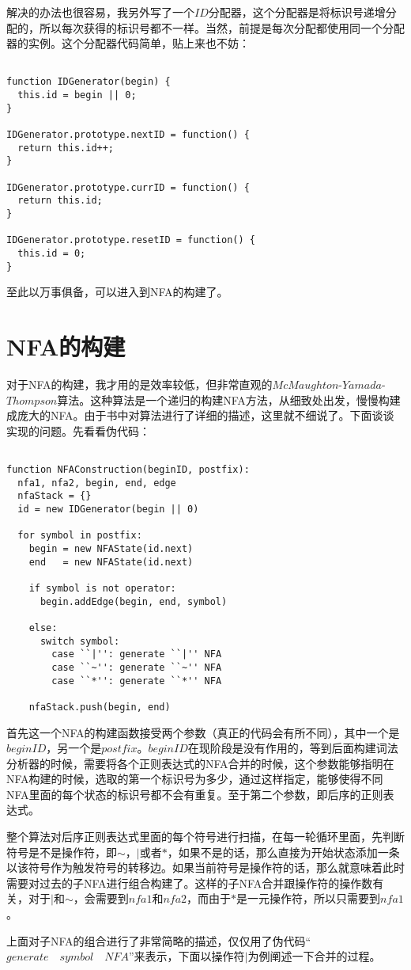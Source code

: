 解决的办法也很容易，我另外写了一个$ID$分配器，这个分配器是将标识号递增分配的，所以每次获得的标识号都不一样。当然，前提是每次分配都使用同一个分配器的实例。这个分配器代码简单，贴上来也不妨：

\begin{verbatim}

function IDGenerator(begin) {
  this.id = begin || 0;
}

IDGenerator.prototype.nextID = function() {
  return this.id++;
} 

IDGenerator.prototype.currID = function() {
  return this.id;
} 

IDGenerator.prototype.resetID = function() {
  this.id = 0;
}

\end{verbatim}

至此以万事俱备，可以进入到NFA的构建了。


\section{NFA的构建}

对于NFA的构建，我才用的是效率较低，但非常直观的$McMaughton$-$Yamada$-$Thompson$算法。这种算法是一个递归的构建NFA方法，从细致处出发，慢慢构建成庞大的NFA。由于书中对算法进行了详细的描述，这里就不细说了。下面谈谈实现的问题。先看看伪代码：

\begin{verbatim}

function NFAConstruction(beginID, postfix):
  nfa1, nfa2, begin, end, edge
  nfaStack = {}
  id = new IDGenerator(begin || 0)

  for symbol in postfix:
    begin = new NFAState(id.next)
    end   = new NFAState(id.next)

    if symbol is not operator:
      begin.addEdge(begin, end, symbol)

    else:
      switch symbol:
        case ``|'': generate ``|'' NFA
        case ``~'': generate ``~'' NFA
        case ``*'': generate ``*'' NFA

    nfaStack.push(begin, end)

\end{verbatim}

首先这一个NFA的构建函数接受两个参数（真正的代码会有所不同），其中一个是$beginID$，另一个是$postfix$。$beginID$在现阶段是没有作用的，等到后面构建词法分析器的时候，需要将各个正则表达式的NFA合并的时候，这个参数能够指明在NFA构建的时候，选取的第一个标识号为多少，通过这样指定，能够使得不同NFA里面的每个状态的标识号都不会有重复。至于第二个参数，即后序的正则表达式。

整个算法对后序正则表达式里面的每个符号进行扫描，在每一轮循环里面，先判断符号是不是操作符，即$\sim$，$|$或者$*$，如果不是的话，那么直接为开始状态添加一条以该符号作为触发符号的转移边。如果当前符号是操作符的话，那么就意味着此时需要对过去的子NFA进行组合构建了。这样的子NFA合并跟操作符的操作数有关，对于$|$和$\sim$，会需要到$nfa1$和$nfa2$，而由于$*$是一元操作符，所以只需要到$nfa1$。

上面对子NFA的组合进行了非常简略的描述，仅仅用了伪代码“$generate\quad symbol\quad NFA$”来表示，下面以操作符$|$为例阐述一下合并的过程。


